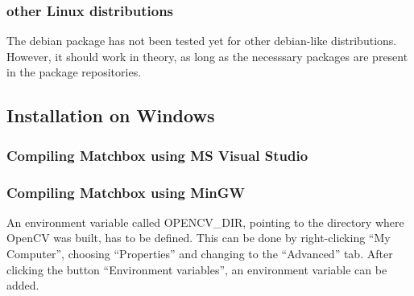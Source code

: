 \subsubsection{other Linux distributions}
The debian package has not been tested yet for other debian-like distributions.
However, it should work in theory, as long as the necesssary packages are present
in the package repositories.

\subsection{Installation on Windows}

\subsubsection{Compiling Matchbox using MS Visual Studio}

\subsubsection{Compiling Matchbox using MinGW}

An environment variable called OPENCV\_DIR, pointing to the 
directory where OpenCV was built, has to be defined. 
This can be done by right-clicking ``My Computer'', choosing 
``Properties'' and changing to the ``Advanced'' tab. After
clicking the button ``Environment variables'', an environment 
variable can be added.

